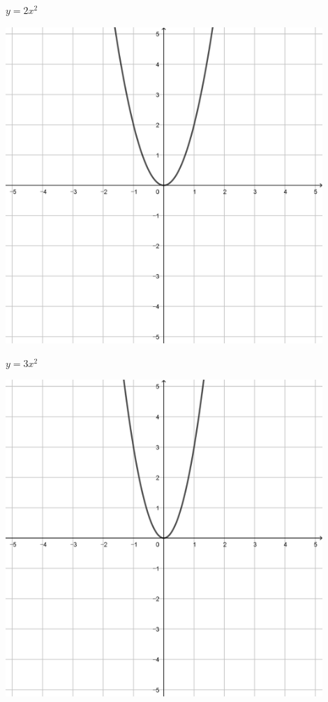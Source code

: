 \documentclass[a4paper]{oblivoir}
\begin{document}
\begin{minipage}{0.45\textwidth}\centering
\(y=2x^2\)
\par\bigskip\includegraphics[width=0.9\textwidth]{img/6-5}
\end{minipage}
\begin{minipage}{0.45\textwidth}\centering
\(y=3x^2\)
\par\bigskip\includegraphics[width=0.9\textwidth]{img/6-6}
\end{minipage}\bigskip\bigskip\par
\end{document}
